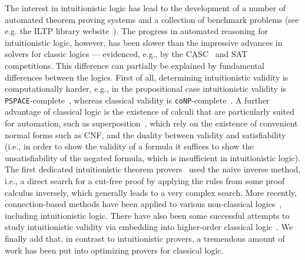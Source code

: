 \documentclass[runningheads]{llncs}
\begin{document}
The interest in intuitionistic logic has lead to the development of a number of automated theorem proving systems and a collection of benchmark problems (see e.g. the ILTP library website~\cite{iltp}).
The progress in automated reasoning for intuitionistic logic, however, has been slower than the  impressive advances in solvers for classic logics --- evidenced, e.g., by the CASC~\cite{casc} and SAT~\cite{satc} competitions.
This difference can partially be explained by fundamental differences between the logics.
First of all, determining intuitionistic validity is computationally harder, e.g., in the propositional case intuitionistic validity is \verb+PSPACE+-complete~\cite{statman1979intuitionistic}, whereas classical validity is \verb+coNP+-complete~\cite{cook1971complexity}.
A further advantage of classical logic is the existence of calculi that are particularly suited for automation, such as superposition~\cite{bachmair2001resolution}, which rely on the existence of convenient normal forms such as CNF, and the duality between validity and satisfiability (i.e., in order to show the validity of a formula it suffices to show the unsatisfiability of the negated formula, which is insufficient in intuitionistic logic).
The first dedicated intuitionistic theorem provers~\cite{mclaughlin2009efficient,tammet1996resolution} used the naive inverse method, i.e., a direct search for a cut-free proof by applying the rules from some proof calculus inversely, which generally leads to a very complex search. 
More recently, connection-based methods have been applied to various non-classical logics~\cite{otten2005clausal,otten2021nanocop}, including intuitionistic logic.
There have also been some successful attempts to study intuitionistic validity via embedding into higher-order classical logic~\cite{LEO}.
We finally add that, in contrast to intuitionistic provers, a tremendous amount of work has been put into optimizing provers for classical logic.
\end{document}
